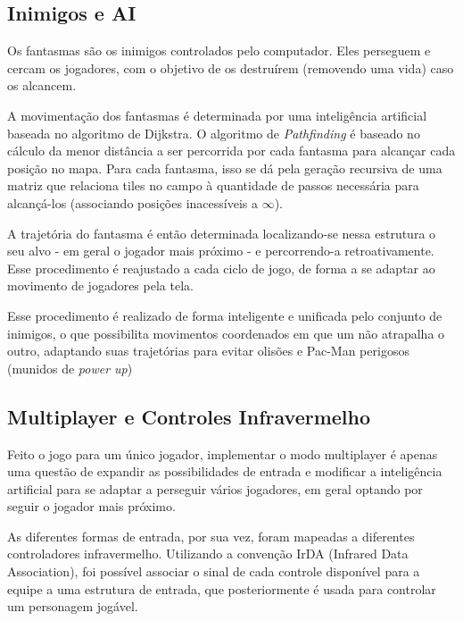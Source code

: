 \documentclass[12pt, a4paper, twocolumn]{article}
\begin{document}


\subsection{Inimigos e AI}

Os fantasmas são os inimigos controlados pelo computador. Eles perseguem e cercam os jogadores, com o objetivo de os destruírem (removendo uma vida) caso os alcancem.

A movimentação dos fantasmas é determinada por uma inteligência artificial baseada no algoritmo de Dijkstra. O algoritmo de \textit{Pathfinding} é baseado no cálculo da menor distância a ser percorrida por cada fantasma para alcançar cada posição no mapa. Para cada fantasma, isso se dá pela geração recursiva de uma matriz que relaciona tiles no campo à quantidade de passos necessária para alcançá-los (associando  posições inacessíveis a $\infty$).

A trajetória do fantasma é então determinada localizando-se nessa estrutura o seu alvo - em geral o jogador mais próximo - e percorrendo-a retroativamente. Esse procedimento é reajustado a cada ciclo de jogo, de forma a se adaptar ao movimento de jogadores pela tela.

Esse procedimento é realizado de forma inteligente e unificada pelo conjunto de inimigos, o que possibilita movimentos coordenados em que um não atrapalha o outro, adaptando suas trajetórias para evitar olisões e Pac-Man perigosos (munidos de \textit{power up})



\subsection{Multiplayer e Controles Infravermelho}

Feito o jogo para um único jogador, implementar o modo multiplayer é apenas uma questão de expandir as possibilidades de entrada e modificar a inteligência artificial para se adaptar a perseguir vários jogadores, em geral optando por seguir o jogador mais próximo.

As diferentes formas de entrada, por sua vez, foram mapeadas a diferentes controladores infravermelho. Utilizando a convenção IrDA (Infrared Data Association), foi possível associar o sinal de cada controle disponível para a equipe a uma estrutura de entrada, que posteriormente é usada para controlar um personagem jogável.
\end{document}

